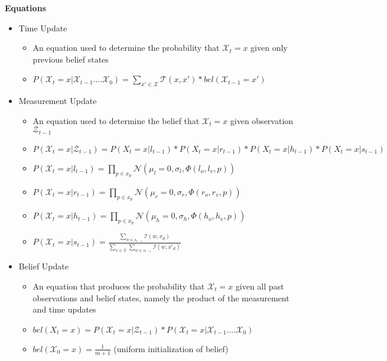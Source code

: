\documentclass[12pt,letterpaper]{article}
\begin{document}
\textbf{Equations}
\begin{itemize}
\item{Time Update}
	\begin{itemize}
	\item{An equation used to determine the probability that $\mathcal{X}_t = x$ given only previous belief states}
	\item{$P(\mathcal{X}_t = x | \mathcal{X}_{t-1} .... \mathcal{X}_0) =\displaystyle\sum_{x' \in \mathcal{X}} \mathcal{T}(x, x')*bel(\mathcal{X}_{t-1} = x')$}
	\end{itemize}
\item{Measurement Update}
	\begin{itemize}
	\item{An equation used to determine the belief that $\mathcal{X}_t = x$ given observation $\mathcal{Z}_{t-1}$}
	\item{$P(\mathcal{X}_t=x | \mathcal{Z}_{t-1}) = P(X_t=x | l_{t-1})*P(X_t=x | r_{t-1})*P(X_t=x |h_{t-1})*P(X_t=x | s_{t-1})$}
	\item{$P(\mathcal{X}_t=x|l_{t-1}) = \displaystyle \prod_{p \in x_p} \mathcal{N}(\mu_l=0, \sigma_l, \Phi(l_o,l_v, p))$\\}
	\item{$P(\mathcal{X}_t=x|r_{t-1}) = \displaystyle \prod_{p \in x_p} \mathcal{N}(\mu_r=0, \sigma_r, \Phi(r_o,r_v, p))$\\}
	\item{$P(\mathcal{X}_t=x|h_{t-1}) = \displaystyle \prod_{p \in x_p} \mathcal{N}(\mu_h=0, \sigma_h, \Phi(h_o,h_v, p))$\\}
	\item{$P(\mathcal{X}_t=x|s_{t-1}) = \frac{\displaystyle\sum_{w\in s_{t-1}} \mathcal{I}(w, x_d)}{\displaystyle\sum_{x \in \mathcal{X}}\sum_{w\in s_{t-1}} \mathcal{I}(w, x'_d)}$}
	\end{itemize}
\item{Belief Update}
	\begin{itemize}
	\item{An equation that produces the probability that $\mathcal{X}_t = x$ given all past observations and belief states, namely the product of the measurement and time updates}
	\item{$bel(X_t = x) = P(\mathcal{X}_t=x | \mathcal{Z}_{t-1})*P(\mathcal{X}_t = x | \mathcal{X}_{t-1} .... \mathcal{X}_0)$}
	\item{$bel(\mathcal{X}_0 = x) =  \frac{1}{m+1}$ (uniform initialization of belief)}
	\end{itemize}
\end{itemize}
\end{document}
